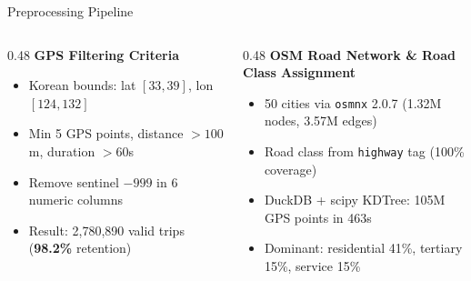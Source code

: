 \documentclass[aspectratio=169, 9pt]{beamer}
\begin{document}
\begin{frame}{Preprocessing Pipeline}
\vspace{6pt}
\begin{columns}[T]
\begin{column}{0.48\textwidth}
  \footnotesize
  \textbf{GPS Filtering Criteria}
  \begin{itemize}\setlength\itemsep{1pt}
    \item Korean bounds: lat $[33, 39]$, lon $[124, 132]$
    \item Min 5 GPS points, distance $> 100$m, duration $> 60$s
    \item Remove sentinel $-999$ in 6 numeric columns
    \item Result: 2,780,890 valid trips (\textbf{98.2\%} retention)
  \end{itemize}
\end{column}
\begin{column}{0.48\textwidth}
  \footnotesize
  \textbf{OSM Road Network \& Road Class Assignment}
  \begin{itemize}\setlength\itemsep{1pt}
    \item 50 cities via \texttt{osmnx} 2.0.7 (1.32M nodes, 3.57M edges)
    \item Road class from \texttt{highway} tag (100\% coverage)
    \item DuckDB + scipy KDTree: 105M GPS points in 463s
    \item Dominant: residential 41\%, tertiary 15\%, service 15\%
  \end{itemize}
\end{column}
\end{columns}
\end{frame}
\end{document}
